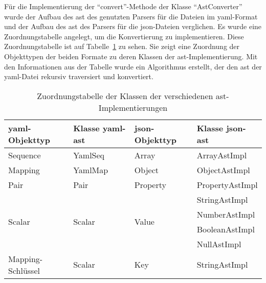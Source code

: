 Für die Implementierung der ``convert''-Methode der Klasse ``AstConverter'' wurde der Aufbau des \ac{ast} des genutzten Parsers für
die Dateien im \ac{yaml}-Format und der Aufbau des \ac{ast} des Parsers für die \ac{json}-Dateien verglichen.
Es wurde eine Zuordnungstabelle angelegt, um die Konvertierung zu implementieren.
Diese Zuordnungstabelle ist auf Tabelle~\ref{tbl:yaml-ast-to-json-ast-convert} zu sehen.
Sie zeigt eine Zuordnung der Objekttypen der beiden Formate zu deren Klassen der \ac{ast}-Implementierung.
Mit den Informationen aus der Tabelle wurde ein Algorithmus erstellt, der den \ac{ast} der \ac{yaml}-Datei rekursiv traversiert und konvertiert.

\begin{table}[h]
      \centering
      \begin{tabular}{|l|l|l|l|}
            \hline
            \acs{yaml}-Objekttyp    & Klasse \acs{yaml}-\acs{ast} & \acs{json}-Objekttyp   & Klasse \acs{json}-\acs{ast} \\
            \hline
            \hline
            Sequence                & YamlSeq                     & Array                  & ArrayAstImpl                \\
            \hline
            Mapping                 & YamlMap                     & Object                 & ObjectAstImpl               \\
            \hline
            Pair                    & Pair                        & Property               & PropertyAstImpl             \\
            \hline
            \multirow{4}{*}{Scalar} & \multirow{4}{*}{Scalar}     & \multirow{4}{*}{Value} & StringAstImpl               \\
                                    &                             &                        & NumberAstImpl               \\
                                    &                             &                        & BooleanAstImpl              \\
                                    &                             &                        & NullAstImpl                 \\
            \hline
            Mapping-Schlüssel       & Scalar                      & Key                    & StringAstImpl               \\
            \hline
      \end{tabular}
      \caption{Zuordnungstabelle der Klassen der verschiedenen \acs{ast}-Implementierungen}
      \label{tbl:yaml-ast-to-json-ast-convert}
\end{table}

